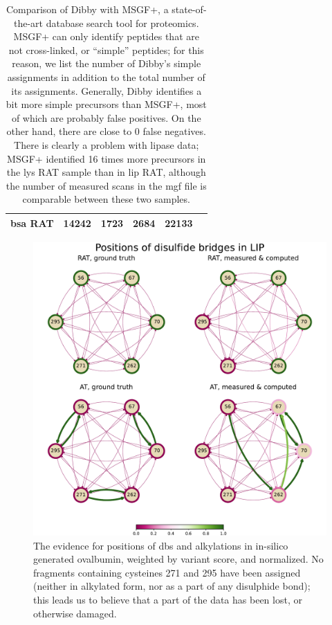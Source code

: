 \begin{table}[ht]
\begin{tabular}{@{}llllll@{}}
    \gls*{bsa} RAT                                       & 14242                           & 1723                                                                   & 2684                              & 22133 &             \\ \bottomrule
  \end{tabular}
  \caption{Comparison of Dibby with MSGF+, a state-of-the-art database search tool for proteomics. MSGF+ can only identify peptides that are not cross-linked, or ``simple'' peptides; for this reason, we list the number of Dibby's simple assignments in addition to the total number of its assignments. Generally, Dibby identifies a bit more simple precursors than MSGF+, most of which are probably false positives. On the other hand, there are close to 0 false negatives. There is clearly a problem with lipase data; MSGF+ identified 16 times more precursors in the \gls*{lys} RAT sample than in \gls*{lip} RAT, although the number of measured scans in the mgf file is comparable between these two samples.}\label{tbl:measurements}
\end{table}

\begin{figure}
  \centering
  \includegraphics[width=0.9\linewidth]{img/lip.pdf}
  \caption{The evidence for positions of \glspl*{db} and alkylations in in-silico generated ovalbumin, weighted by variant score, and normalized. No fragments containing cysteines 271 and 295 have been assigned (neither in alkylated form, nor as a part of any disulphide bond); this leads us to believe that a part of the data has been lost, or otherwise damaged.}\label{fig:lip}
\end{figure}

